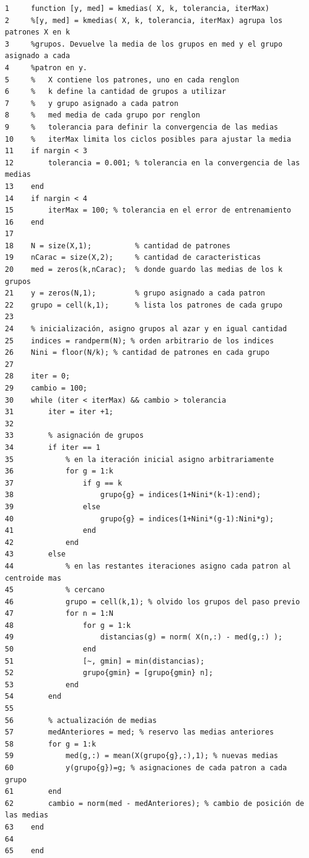 \documentclass[11pt,a4paper,final]{article}
\begin{document}
\begin{verbatim}
1     function [y, med] = kmedias( X, k, tolerancia, iterMax)
2     %[y, med] = kmedias( X, k, tolerancia, iterMax) agrupa los patrones X en k
3     %grupos. Devuelve la media de los grupos en med y el grupo asignado a cada
4     %patron en y.
5     %   X contiene los patrones, uno en cada renglon
6     %   k define la cantidad de grupos a utilizar
7     %   y grupo asignado a cada patron
8     %   med media de cada grupo por renglon
9     %   tolerancia para definir la convergencia de las medias
10    %   iterMax limita los ciclos posibles para ajustar la media
11    if nargin < 3
12        tolerancia = 0.001; % tolerancia en la convergencia de las medias
13    end
14    if nargin < 4
15        iterMax = 100; % tolerancia en el error de entrenamiento
16    end
17    
18    N = size(X,1);          % cantidad de patrones
19    nCarac = size(X,2);     % cantidad de caracteristicas
20    med = zeros(k,nCarac);  % donde guardo las medias de los k grupos
21    y = zeros(N,1);         % grupo asignado a cada patron
22    grupo = cell(k,1);      % lista los patrones de cada grupo
23    
24    % inicialización, asigno grupos al azar y en igual cantidad
25    indices = randperm(N); % orden arbitrario de los indices
26    Nini = floor(N/k); % cantidad de patrones en cada grupo
27    
28    iter = 0;
29    cambio = 100;
30    while (iter < iterMax) && cambio > tolerancia
31        iter = iter +1;
32        
33        % asignación de grupos
34        if iter == 1
35            % en la iteración inicial asigno arbitrariamente
36            for g = 1:k
37                if g == k
38                    grupo{g} = indices(1+Nini*(k-1):end);
39                else
40                    grupo{g} = indices(1+Nini*(g-1):Nini*g);
41                end
42            end
43        else
44            % en las restantes iteraciones asigno cada patron al centroide mas 
45            % cercano
46            grupo = cell(k,1); % olvido los grupos del paso previo
47            for n = 1:N
48                for g = 1:k
49                    distancias(g) = norm( X(n,:) - med(g,:) );
50                end
51                [~, gmin] = min(distancias);
52                grupo{gmin} = [grupo{gmin} n];
53            end
54        end
55        
56        % actualización de medias
57        medAnteriores = med; % reservo las medias anteriores
58        for g = 1:k
59            med(g,:) = mean(X(grupo{g},:),1); % nuevas medias
60            y(grupo{g})=g; % asignaciones de cada patron a cada grupo
61        end
62        cambio = norm(med - medAnteriores); % cambio de posición de las medias
63    end
64    
65    end
\end{verbatim}
\end{document}
